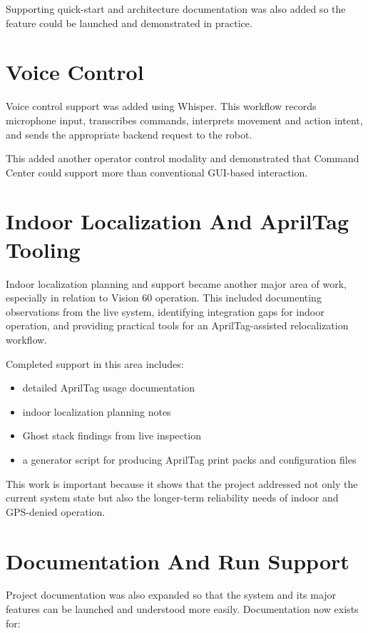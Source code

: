 \documentclass[11pt]{article}
\begin{document}
Supporting quick-start and architecture documentation was also added so the feature could be launched and demonstrated in practice.

\section{Voice Control}

Voice control support was added using Whisper. This workflow records microphone input, transcribes commands, interprets movement and action intent, and sends the appropriate backend request to the robot.

This added another operator control modality and demonstrated that Command Center could support more than conventional GUI-based interaction.

\section{Indoor Localization And AprilTag Tooling}

Indoor localization planning and support became another major area of work, especially in relation to Vision 60 operation. This included documenting observations from the live system, identifying integration gaps for indoor operation, and providing practical tools for an AprilTag-assisted relocalization workflow.

Completed support in this area includes:

\begin{itemize}
  \item detailed AprilTag usage documentation
  \item indoor localization planning notes
  \item Ghost stack findings from live inspection
  \item a generator script for producing AprilTag print packs and configuration files
\end{itemize}

This work is important because it shows that the project addressed not only the current system state but also the longer-term reliability needs of indoor and GPS-denied operation.

\section{Documentation And Run Support}

Project documentation was also expanded so that the system and its major features can be launched and understood more easily. Documentation now exists for:
\end{document}
